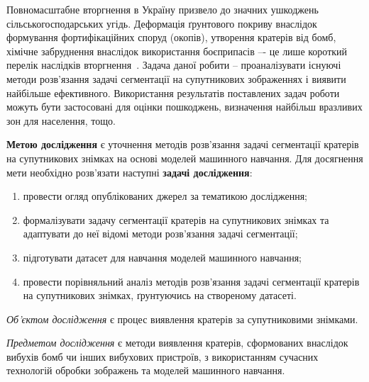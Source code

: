 Повномасштабне вторгнення
в Україну призвело до значних ушкоджень сільськогосподарських угідь.
Деформація ґрунтового покриву внаслідок формування фортифікаційних
споруд (окопів), утворення кратерів від бомб, хімічне забруднення внаслідок
використання боєприпасів –- це лише короткий перелік наслідків вторгнення~\cite{golubtsov2023}.
Задача даної робити -- проаналізувати існуючі методи розв'язання задачі сегментації
на супутникових зображеннях і виявити найбільше ефективного.
Використання результатів поставлених задач роботи можуть бути застосовані для оцінки пошкоджень,
визначення найбільш вразливих зон для населення, тощо.

\textbf{Метою дослідження} є уточнення методів
розв'язання задачі сегментації кратерів на супутникових знімках
на основі моделей машинного навчання.
Для досягнення мети необхідно розв'язати наступні \textbf{задачі дослідження}:

\begin{enumerate}
    \item провести огляд опублікованих джерел за тематикою дослідження;
    \item формалізувати задачу сегментації кратерів на супутникових знімках
          та адаптувати до неї відомі методи розв'язання задачі сегментації;
    \item підготувати датасет для навчання моделей машинного навчання;
    \item провести порівняльний аналіз методів розв'язання задачі сегментації
          кратерів на супутникових знімках, ґрунтуючись на створеному датасеті.
\end{enumerate}

\emph{Об'єктом дослідження} є процес виявлення кратерів за супутниковими знімками.

\emph{Предметом дослідження} є методи виявлення кратерів, сформованих внаслідок вибухів
бомб чи інших вибухових пристроїв, з використанням сучасних технологій обробки зображень
та моделей машинного навчання.